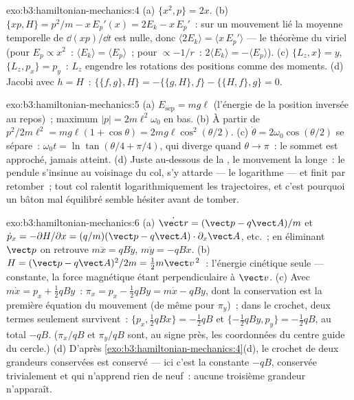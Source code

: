 \begin{solution}{exo:b3:hamiltonian-mechanics:4}
(a) $\{x^2, p\} = 2x$. (b) $\{xp, H\} = p^2/m - x\,E_p'(x) = 2E_k -
x\,E_p'$~: sur un mouvement lié la moyenne temporelle de $\dd(xp)/\dd t$
est nulle, donc $\langle 2E_k\rangle = \langle x\,E_p'\rangle$ --- le
théorème du viriel (pour $E_p \propto x^2$~: $\langle E_k\rangle = \langle
E_p\rangle$~; pour $\propto -1/r$~: $2\langle E_k\rangle = -\langle
E_p\rangle$). (c) $\{L_z, x\} = y$, $\{L_z, p_x\} = p_y$~: $L_z$
engendre les rotations des positions comme des moments. (d) Jacobi avec $h
= H$~: $\{\{f, g\}, H\} = -\{\{g, H\}, f\} - \{\{H, f\}, g\} = 0$.
\end{solution}

\begin{solution}{exo:b3:hamiltonian-mechanics:5}
(a) $E_{\text{sep}} = mg\ell$ (l'énergie de la position inversée au
repos)~; maximum $|p| = 2m\ell^2\omega_0$ en bas. (b) À partir de
$p^2/2m\ell^2 = mg\ell(1 + \cos\theta) = 2mg\ell\cos^2(\theta/2)$. (c)
$\dot\theta = 2\omega_0\cos(\theta/2)$ se sépare~: $\omega_0t =
\ln\tan(\theta/4 + \pi/4)$, qui diverge quand $\theta \to \pi$~: le
sommet est approché, jamais atteint. (d) Juste au-dessous de la , le
mouvement la longe~: le pendule s'insinue au voisinage du col, s'y
attarde --- le logarithme --- et finit par retomber~; tout col ralentit
logarithmiquement les trajectoires, et c'est pourquoi un bâton mal
équilibré semble hésiter avant de tomber.
\end{solution}

\begin{solution}{exo:b3:hamiltonian-mechanics:6}
(a) $\dot{\vect r} = (\vect p - q\vect A)/m$ et $\dot p_x =
-\partial H/\partial x = (q/m)(\vect p - q\vect A)\cdot\partial_x\vect
A$, etc.~; en éliminant $\vect p$ on retrouve $m\ddot x = qB\dot y$,
$m\ddot y = -qB\dot x$. (b) $H = (\vect p - q\vect A)^2/2m = \tfrac12
m\vect v^{\,2}$~: l'énergie cinétique seule --- constante, la force
magnétique étant perpendiculaire à $\vect v$. (c) Avec $m\dot x = p_x +
\tfrac12 qBy$~: $\pi_x = p_x - \tfrac12 qBy = m\dot x - qBy$, dont la
conservation est la première équation du mouvement (de même pour $\pi_y$)~; dans
le crochet, deux termes seulement survivent~: $\{p_x, \tfrac12 qBx\} = -\tfrac12
qB$ et $\{-\tfrac12 qBy, p_y\} = -\tfrac12 qB$, au total $-qB$. ($\pi_x/qB$ et $\pi_y/qB$
sont, au signe près, les coordonnées du centre guide du cercle.) (d)
D'après \cref{exo:b3:hamiltonian-mechanics:4}(d), le crochet de deux
grandeurs conservées est conservé --- ici c'est la constante $-qB$,
conservée trivialement et qui n'apprend rien de neuf~: aucune
troisième grandeur n'apparaît.
\end{solution}

